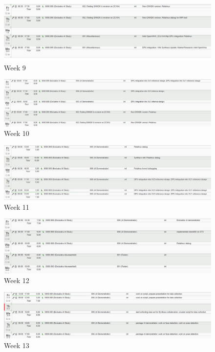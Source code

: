 \begin{figure}[!htb]
	\centering
		\includegraphics[width=\textwidth]{timetable/week9.png}
		\caption{Week 9}
\end{figure}

\begin{figure}[!htb]
	\centering
		\includegraphics[width=\textwidth]{timetable/week10.png}
		\caption{Week 10}
\end{figure}

\begin{figure}[!htb]
	\centering
		\includegraphics[width=\textwidth]{timetable/week11.png}
		\caption{Week 11}
\end{figure}

\begin{figure}[!htb]
	\centering
		\includegraphics[width=\textwidth]{timetable/week12.png}
		\caption{Week 12}
\end{figure}

\begin{figure}[!htb]
	\centering
		\includegraphics[width=\textwidth]{timetable/week13.png}
		\caption{Week 13}
\end{figure}

